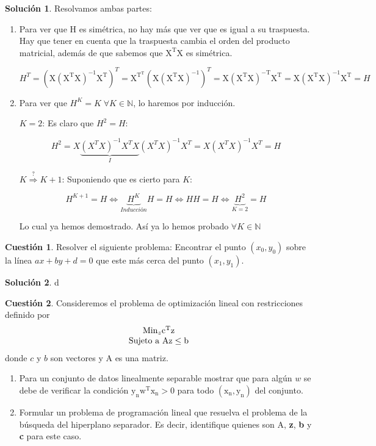 \documentclass[a4paper, 11pt]{article}
\theoremstyle{definition}
\newtheorem{cuestion}{Cuestión}
\newtheorem*{solucion}{Solución}
\begin{document}
  \begin{solucion}
    Resolvamos ambas partes:
    \begin{enumerate}
      \item Para ver que H es simétrica, no hay más que ver que es igual a su traspuesta. Hay que tener en cuenta que la traspuesta cambia el orden del producto matricial, además de que sabemos que $\mathrm{X^TX}$ es simétrica.

      $$H^T = \left(\mathrm{X(X^TX)^{-1}X^T} \right) ^T = \mathrm{X^{T^T}} \left( \mathrm{X(X^TX)^{-1}}\right)^T = \mathrm{X(X^TX)^{-T}X^T} = \mathrm{X(X^TX)^{-1}X^T} = H$$

      \item Para ver que $H^K = K \; \forall K \in \mathbb{N}$, lo haremos por inducción.

      \underline{$K = 2$}: Es claro que $H^2=H$:

      $$H^2 = X\underbrace{(X^TX)^{-1}X^TX}_{I}(X^TX)^{-1}X^T = X(X^TX)^{-1}X^T = H$$

      \underline{$K \overset{?}{\Rightarrow} K + 1$}: Suponiendo que es cierto para $K$:

      $$H^{K+1} = H \Leftrightarrow \underbrace{H^K}_{Inducción} H = H \Leftrightarrow H H = H \Leftrightarrow \underbrace{H^2}_{K=2}=H$$

      Lo cual ya hemos demostrado. Así ya lo hemos probado $\forall K \in \mathbb{N}$

    \end{enumerate}

  \end{solucion}

  \begin{cuestion}
    Resolver el siguiente problema: Encontrar el punto $(x_0,y_0)$ sobre la línea $ax+by+d=0$ que este más cerca del punto $(x_1,y_1)$.

  \end{cuestion}

  \begin{solucion}
    d
  \end{solucion}

  \begin{cuestion}
    Consideremos el problema de optimización lineal con restricciones definido por
    \[
    \begin{array}{c}
    \text{Min}_{z} \mathrm{c^Tz} \\
    \hbox{Sujeto a } \mathrm{Az \leq b}
    \end{array}
    \]
    donde $c$ y $b$ son vectores y A es una matriz.

         \begin{enumerate}
            \item Para un conjunto de datos linealmente separable mostrar que para algún $w$ se debe de verificar la condición  $\mathrm{y_nw^Tx_n>0 }$ para todo $\mathrm{(x_n,y_n)}$ del conjunto.
            \item Formular un problema de programación lineal que resuelva el problema de la búsqueda del hiperplano separador. Es decir, identifique quienes son A, \textbf{z}, \textbf{b} y \textbf{c} para este caso.
        \end{enumerate}
  \end{cuestion}
\end{document}

